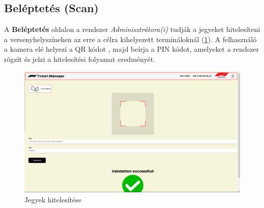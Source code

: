 \pagebreak
\subsection {Beléptetés (Scan)}

A \textbf{Beléptetés} oldalon a rendszer \textit{Adminisztrátora(i)} tudják a jegyeket hitelesíteni a versenyhelyszíneken az erre a célra kihelyezett termináloknál (\ref{abra:scan}). A felhasználó a kamera elé helyezi a QR kódot \cite{RQR}, majd beírja a PIN kódot, amelyeket a rendszer rögzít és jelzi a hitelesítési folyamat eredményét.

\begin{figure}[!h]
	\centering
	\includegraphics[scale=0.2]{images/scan}
	\caption{Jegyek hitelesítése}
	\label{abra:scan}
\end{figure}